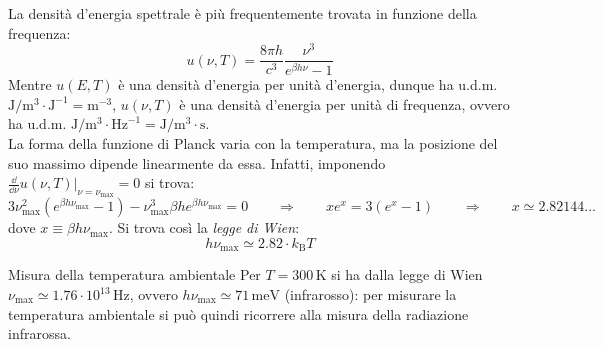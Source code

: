 La densità d'energia spettrale è più frequentemente trovata in funzione della frequenza:
\begin{equation}
	u(\nu,T) = \frac{8\pi h}{c^3} \frac{\nu^3}{e^{\beta h \nu} - 1}
\end{equation}
Mentre $ u(E,T) $ è una densità d'energia per unità d'energia, dunque ha u.d.m. $ \text{J}/\text{m}^3 \cdot \text{J}^{-1} = \text{m}^{-3} $, $ u(\nu,T) $ è una densità d'energia per unità di frequenza, ovvero ha u.d.m. $ \text{J}/\text{m}^3 \cdot \text{Hz}^{-1} = \text{J}/\text{m}^3 \cdot \text{s} $. \\
La forma della funzione di Planck varia con la temperatura, ma la posizione del suo massimo dipende linearmente da essa. Infatti, imponendo $ \frac{\dd}{\dd \nu} u(\nu, T)\vert_{\nu = \nu_\text{max}} = 0 $ si trova:
\begin{equation*}
	3 \nu_\text{max}^2 (e^{\beta h \nu_\text{max}} - 1) - \nu_\text{max}^3 \beta h e^{\beta h \nu_\text{max}} = 0
	\qquad \Rightarrow \qquad
	x e^x = 3 (e^x - 1)
	\qquad \Rightarrow \qquad
	x \simeq 2.82144\dots
\end{equation*}
dove $ x \equiv \beta h \nu_\text{max} $. Si trova così la \textit{legge di Wien}:
\begin{equation}
	h \nu_\text{max} \simeq 2.82 \cdot k_\text{B} T
\end{equation}

\begin{example}{Misura della temperatura ambientale}{}
	Per $ T = 300 \,\text{K} $ si ha dalla legge di Wien $ \nu_\text{max} \simeq 1.76 \cdot 10^{13} \,\text{Hz} $, ovvero $ h \nu_\text{max} \simeq 71 \,\text{meV} $ (infrarosso): per misurare la temperatura ambientale si può quindi ricorrere alla misura della radiazione infrarossa.
\end{example}

